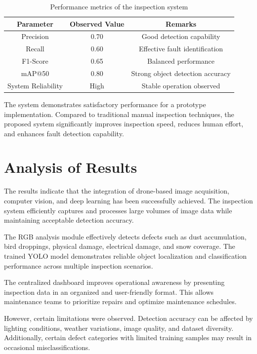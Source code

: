 \begin{table}[htb]
\centering
\caption{Performance metrics of the inspection system}
\begin{tabular}{|c|c|c|}
\hline
\textbf{Parameter} & \textbf{Observed Value} & \textbf{Remarks} \\
\hline
Precision & 0.70 & Good detection capability \\
\hline
Recall & 0.60 & Effective fault identification \\
\hline
F1-Score & 0.65 & Balanced performance \\
\hline
mAP@50 & 0.80 & Strong object detection accuracy \\
\hline
System Reliability & High & Stable operation observed \\
\hline
\end{tabular}
\label{tab:performance}
\end{table}

The system demonstrates satisfactory performance for a prototype implementation. Compared to traditional manual inspection techniques, the proposed system significantly improves inspection speed, reduces human effort, and enhances fault detection capability.

\section{Analysis of Results}

The results indicate that the integration of drone-based image acquisition, computer vision, and deep learning has been successfully achieved. The inspection system efficiently captures and processes large volumes of image data while maintaining acceptable detection accuracy.

The RGB analysis module effectively detects defects such as dust accumulation, bird droppings, physical damage, electrical damage, and snow coverage. The trained YOLO model demonstrates reliable object localization and classification performance across multiple inspection scenarios.

The centralized dashboard improves operational awareness by presenting inspection data in an organized and user-friendly format. This allows maintenance teams to prioritize repairs and optimize maintenance schedules.

However, certain limitations were observed. Detection accuracy can be affected by lighting conditions, weather variations, image quality, and dataset diversity. Additionally, certain defect categories with limited training samples may result in occasional misclassifications.

